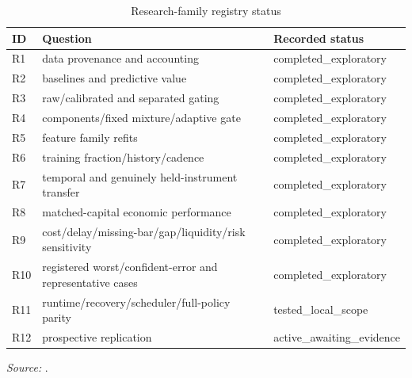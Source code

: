 \begin{table}[!htbp]\centering\footnotesize\setlength{\tabcolsep}{3pt}\renewcommand{\arraystretch}{1.14}
\caption{Research-family registry status}\label{tab:22}
\begin{tabular}{@{}>{\raggedright\arraybackslash}p{}>{\raggedright\arraybackslash}p{}>{\raggedright\arraybackslash}p{}@{}}
\toprule
\textbf{ID} & \textbf{Question} & \textbf{Recorded status} \\
\midrule
R1 & data provenance and accounting & completed\_\allowbreak{}exploratory \\
R2 & baselines and predictive value & completed\_\allowbreak{}exploratory \\
R3 & raw/\allowbreak{}calibrated and separated gating & completed\_\allowbreak{}exploratory \\
R4 & components/\allowbreak{}fixed mixture/\allowbreak{}adaptive gate & completed\_\allowbreak{}exploratory \\
R5 & feature family refits & completed\_\allowbreak{}exploratory \\
R6 & training fraction/\allowbreak{}history/\allowbreak{}cadence & completed\_\allowbreak{}exploratory \\
R7 & temporal and genuinely held-instrument transfer & completed\_\allowbreak{}exploratory \\
R8 & matched-capital economic performance & completed\_\allowbreak{}exploratory \\
R9 & cost/\allowbreak{}delay/\allowbreak{}missing-bar/\allowbreak{}gap/\allowbreak{}liquidity/\allowbreak{}risk sensitivity & completed\_\allowbreak{}exploratory \\
R10 & registered worst/\allowbreak{}confident-error and representative cases & completed\_\allowbreak{}exploratory \\
R11 & runtime/\allowbreak{}recovery/\allowbreak{}scheduler/\allowbreak{}full-policy parity & tested\_\allowbreak{}local\_\allowbreak{}scope \\
R12 & prospective replication & active\_\allowbreak{}awaiting\_\allowbreak{}evidence \\
\bottomrule\end{tabular}\par\smallskip
\raggedright\textit{Source:} .
\end{table}
